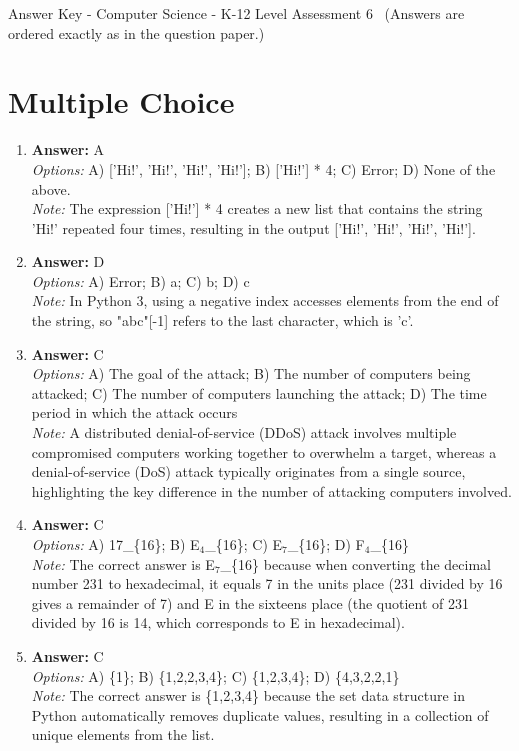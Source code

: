 \documentclass[12pt]{article}
\begin{document}
\begin{center}
Answer Key - Computer Science - K-12 Level Assessment 6 \
\small (Answers are ordered exactly as in the question paper.)
\end{center}

\section*{Multiple Choice}
\begin{enumerate}[label=\arabic*.]
\item \textbf{Answer:} A
\\ \textit{Options:} A) ['Hi!', 'Hi!', 'Hi!', 'Hi!']; B) ['Hi!'] * 4; C) Error; D) None of the above.
\\ \textit{Note:} The expression ['Hi!'] * 4 creates a new list that contains the string 'Hi!' repeated four times, resulting in the output ['Hi!', 'Hi!', 'Hi!', 'Hi!'].
\item \textbf{Answer:} D
\\ \textit{Options:} A) Error; B) a; C) b; D) c
\\ \textit{Note:} In Python 3, using a negative index accesses elements from the end of the string, so "abc"[-1] refers to the last character, which is 'c'.
\item \textbf{Answer:} C
\\ \textit{Options:} A) The goal of the attack; B) The number of computers being attacked; C) The number of computers launching the attack; D) The time period in which the attack occurs
\\ \textit{Note:} A distributed denial-of-service (DDoS) attack involves multiple compromised computers working together to overwhelm a target, whereas a denial-of-service (DoS) attack typically originates from a single source, highlighting the key difference in the number of attacking computers involved.
\item \textbf{Answer:} C
\\ \textit{Options:} A) 17\_\{16\}; B) E$_{4}$\_\{16\}; C) E$_{7}$\_\{16\}; D) F$_{4}$\_\{16\}
\\ \textit{Note:} The correct answer is E$_{7}$\_\{16\} because when converting the decimal number 231 to hexadecimal, it equals 7 in the units place (231 divided by 16 gives a remainder of 7) and E in the sixteens place (the quotient of 231 divided by 16 is 14, which corresponds to E in hexadecimal).
\item \textbf{Answer:} C
\\ \textit{Options:} A) \{1\}; B) \{1,2,2,3,4\}; C) \{1,2,3,4\}; D) \{4,3,2,2,1\}
\\ \textit{Note:} The correct answer is \{1,2,3,4\} because the set data structure in Python automatically removes duplicate values, resulting in a collection of unique elements from the list.
\end{enumerate}
\end{document}
